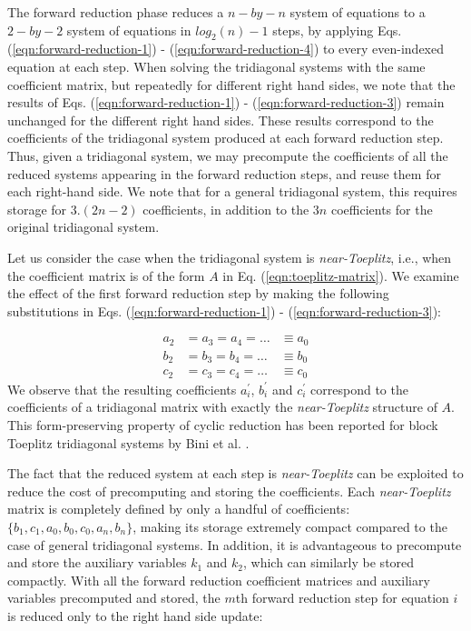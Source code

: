 The forward reduction phase reduces
a $n-by-n$ system of equations to a
$2-by-2$ system of equations in $log_2(n)-1$ steps,
by applying
Eqs. (\ref{eqn:forward-reduction-1}) -
(\ref{eqn:forward-reduction-4})
to every even-indexed equation at each step.
When solving the tridiagonal systems
with the same coefficient matrix,
but repeatedly for different right hand sides,
we note that the results of
Eqs. (\ref{eqn:forward-reduction-1}) -
(\ref{eqn:forward-reduction-3})
remain unchanged for the different right hand sides.
These results correspond to the
coefficients of the tridiagonal system
produced at each forward reduction step.
Thus, given a tridiagonal system,
we may precompute
the coefficients of all
the reduced systems appearing in the
forward reduction steps,
and reuse them for each right-hand side.
We note that for a general tridiagonal system,
this requires storage for $3.(2n - 2)$ coefficients,
in addition to the $3n$ coefficients
for the original tridiagonal system.

Let us consider the case
when the tridiagonal system is \emph{near-Toeplitz},
i.e., when the coefficient matrix is of the form
$A$ in Eq. (\ref{eqn:toeplitz-matrix}).
We examine the effect of the
first forward reduction step by making the following substitutions
in Eqs. (\ref{eqn:forward-reduction-1}) -
(\ref{eqn:forward-reduction-3}):

\begin{align*}
    a_2 &= a_3 = a_4 = \hdots &\equiv a_0 \\
    b_2 &= b_3 = b_4 = \hdots &\equiv b_0 \\
    c_2 &= c_3 = c_4 = \hdots &\equiv c_0
\end{align*}
%
We observe that the resulting coefficients
$a_i^\prime$, $b_i^\prime$ and $c_i^\prime$
correspond to the coefficients of a tridiagonal matrix with
exactly the \emph{near-Toeplitz} structure of $A$.
This form-preserving property of cyclic reduction
has been reported for block Toeplitz tridiagonal systems
by Bini et al. \cite{bini}.

The fact that the reduced system at each step
is \emph{near-Toeplitz} can be exploited
to reduce the cost of
precomputing and storing the coefficients.
Each \emph{near-Toeplitz} matrix is completely defined
by only a handful of coefficients:
$\{b_1, c_1, a_0, b_0, c_0, a_n, b_n\}$,
making its storage extremely compact
compared to the case of general tridiagonal systems.
In addition,
it is advantageous to precompute and store the
auxiliary variables $k_1$ and $k_2$,
which can similarly be stored compactly.
With all the forward reduction coefficient matrices
and auxiliary variables precomputed and stored,
the $m$th forward reduction step for equation $i$
is reduced only to the right hand side update:

